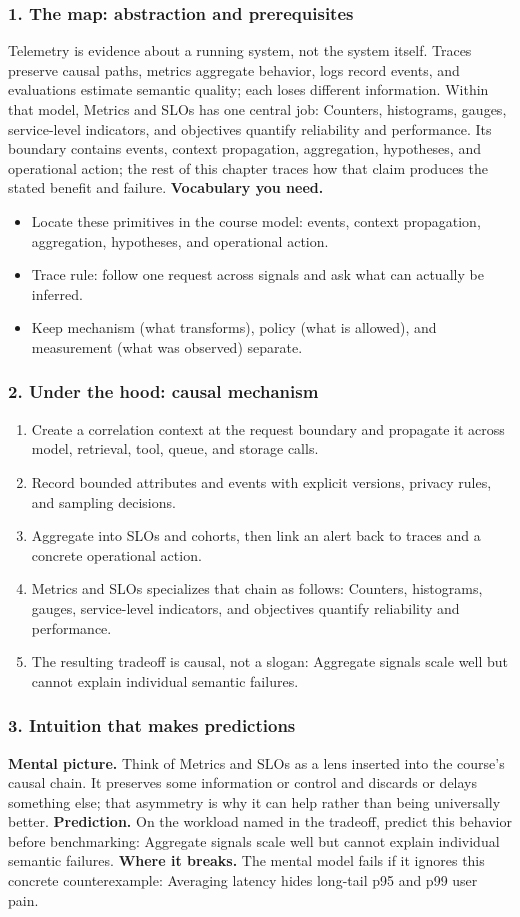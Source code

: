 \subsubsection*{1. The map: abstraction and prerequisites}
Telemetry is evidence about a running system, not the system itself. Traces preserve causal paths, metrics aggregate behavior, logs record events, and evaluations estimate semantic quality; each loses different information.
Within that model, Metrics and SLOs has one central job: Counters, histograms, gauges, service-level indicators, and objectives quantify reliability and performance. Its boundary contains events, context propagation, aggregation, hypotheses, and operational action; the rest of this chapter traces how that claim produces the stated benefit and failure.
\textbf{Vocabulary you need.}\begin{itemize}
\item Locate these primitives in the course model: events, context propagation, aggregation, hypotheses, and operational action.
\item Trace rule: follow one request across signals and ask what can actually be inferred.
\item Keep mechanism (what transforms), policy (what is allowed), and measurement (what was observed) separate.
\end{itemize}
\subsubsection*{2. Under the hood: causal mechanism}\begin{enumerate}
\item Create a correlation context at the request boundary and propagate it across model, retrieval, tool, queue, and storage calls.
\item Record bounded attributes and events with explicit versions, privacy rules, and sampling decisions.
\item Aggregate into SLOs and cohorts, then link an alert back to traces and a concrete operational action.
\item Metrics and SLOs specializes that chain as follows: Counters, histograms, gauges, service-level indicators, and objectives quantify reliability and performance.
\item The resulting tradeoff is causal, not a slogan: Aggregate signals scale well but cannot explain individual semantic failures.
\end{enumerate}
\subsubsection*{3. Intuition that makes predictions}
\textbf{Mental picture.} Think of Metrics and SLOs as a lens inserted into the course's causal chain. It preserves some information or control and discards or delays something else; that asymmetry is why it can help rather than being universally better.
\textbf{Prediction.} On the workload named in the tradeoff, predict this behavior before benchmarking: Aggregate signals scale well but cannot explain individual semantic failures.
\textbf{Where it breaks.} The mental model fails if it ignores this concrete counterexample: Averaging latency hides long-tail p95 and p99 user pain.
